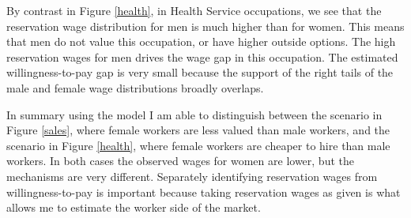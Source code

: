 \documentclass[12pt]{article}
\begin{document}

By contrast in Figure \ref{health}, in Health Service occupations, we see that the reservation wage distribution for men is much higher than for women. This means that men do not value this occupation, or have higher outside options. The high reservation wages for men drives the wage gap in this occupation. The estimated willingness-to-pay gap is very small because the support of the right tails of the male and female wage distributions broadly overlaps.


In summary using the model I am able to distinguish between the scenario in Figure \ref{sales}, where female workers are less valued than male workers, and the scenario in Figure \ref{health}, where female workers are cheaper to hire than male workers. In both cases the observed wages for women are lower, but the mechanisms are very different. Separately identifying reservation wages from willingness-to-pay is important because taking reservation wages as given is what allows me to estimate the worker side of the market.





\end{document}
